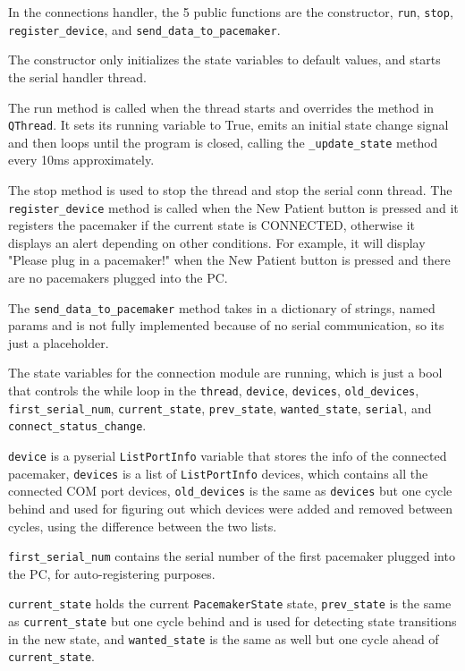 \documentclass[12pt]{article}
\begin{document}
In the connections handler, the 5 public functions are the constructor, \verb|run|, \verb|stop|, \\ \verb|register_device|, and \verb|send_data_to_pacemaker|.

The constructor only initializes the state variables to default values, and starts the serial handler thread.

The run method is called when the thread starts and overrides the method in \verb|QThread|.
It sets its running variable to True, emits an initial state change signal and then loops until the program is closed, calling the \verb|_update_state| method every 10ms approximately.

The stop method is used to stop the thread and stop the serial conn thread.
The \verb|register_device| method is called when the New Patient button is pressed and it registers the pacemaker if the current state is CONNECTED, otherwise it displays an alert depending on other conditions.
For example, it will display "Please plug in a pacemaker!" when the New Patient button is pressed and there are no pacemakers plugged into the PC.

The \verb|send_data_to_pacemaker| method takes in a dictionary of strings, named params and is not fully implemented because of no serial communication, so its just a placeholder.

The state variables for the connection module are running, which is just a bool that controls the while loop in the \verb|thread|, \verb|device|, \verb|devices|, \verb|old_devices|, \verb|first_serial_num|, \verb|current_state|, \verb|prev_state|, \verb|wanted_state|, \verb|serial|, and \verb|connect_status_change|.

\verb|device| is a pyserial \verb|ListPortInfo| variable that stores the info of the connected pacemaker, \verb|devices| is a list of \verb|ListPortInfo| devices, which contains all the connected COM port devices, \verb|old_devices| is the same as \verb|devices| but one cycle behind and used for figuring out which devices were added and removed between cycles, using the difference between the two lists.

\verb|first_serial_num| contains the serial number of the first pacemaker plugged into the PC, for auto-registering purposes.

\verb|current_state| holds the current \verb|PacemakerState| state, \verb|prev_state| is the same as \verb|current_state| but one cycle behind and is used for detecting state transitions in the new state, and \verb|wanted_state| is the same as well but one cycle ahead of \verb|current_state|.
\end{document}
